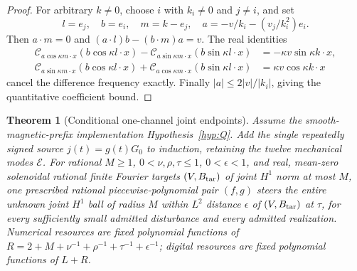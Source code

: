 \documentclass[11pt,a4paper]{amsart}
\newtheorem{theorem}{Theorem}[section]
\theoremstyle{definition}
\theoremstyle{remark}
\numberwithin{equation}{section}
\newcommand{\Ccal}{\mathcal C}
\begin{document}
\begin{proof}
For arbitrary $k\ne0$, choose $i$ with $k_i\ne0$ and $j\ne i$, and set
\[
 l=e_j,\quad b=e_i,\quad m=k-e_j,\quad
 a=-v/k_i-(v_j/k_i^2)e_i.
\]
Then $a\cdot m=0$ and $(a\cdot l)b-(b\cdot m)a=v$. The real identities
\begin{align*}
 \Ccal_{a\cos\kappa m\cdot x}(b\cos\kappa l\cdot x)
 -\Ccal_{a\sin\kappa m\cdot x}(b\sin\kappa l\cdot x)
 &=-\kappa v\sin\kappa k\cdot x,\\
 \Ccal_{a\sin\kappa m\cdot x}(b\cos\kappa l\cdot x)
 +\Ccal_{a\cos\kappa m\cdot x}(b\sin\kappa l\cdot x)
 &=\kappa v\cos\kappa k\cdot x
\end{align*}
cancel the difference frequency exactly. Finally $|a|\le2|v|/|k_i|$, giving the quantitative coefficient bound.
\end{proof}

\begin{theorem}[Conditional one-channel joint endpoints]\label{thm:channel}
Assume the smooth-magnetic-prefix implementation Hypothesis~\ref{hyp:Q}. Add the single repeatedly signed source $j(t)=g(t)G_0$ to induction, retaining the twelve mechanical modes $\mathcal E$. For rational $M\ge1$, $0<\nu,\rho,\tau\le1$, $0<\epsilon<1$, and real, mean-zero solenoidal rational finite Fourier targets $(V,B_{\rm tar})$ of joint $H^1$ norm at most $M$, one prescribed rational piecewise-polynomial pair $(f,g)$ steers the entire unknown joint $H^1$ ball of radius $M$ within $L^2$ distance $\epsilon$ of $(V,B_{\rm tar})$ at $\tau$, for every sufficiently small admitted disturbance and every admitted realization. Numerical resources are fixed polynomial functions of
$R=2+M+\nu^{-1}+\rho^{-1}+\tau^{-1}+\epsilon^{-1}$; digital resources are fixed polynomial functions of $L+R$.
\end{theorem}
\end{document}
